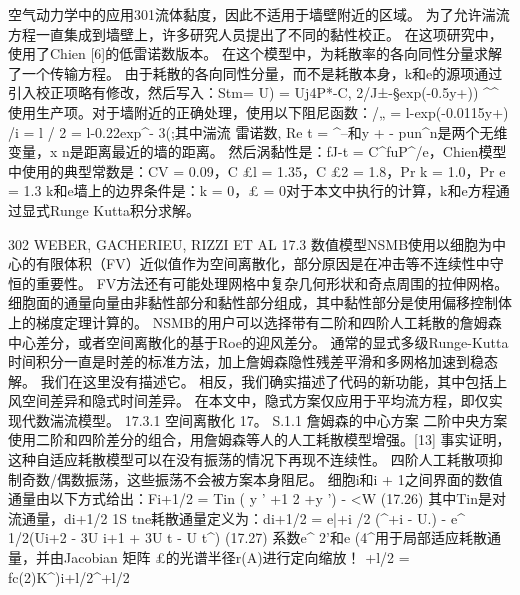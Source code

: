 \documentclass[UTF8,11pt,a4paper,openany,fontset=fandol]{ctexbook}
\begin{document}
空气动力学中的应用301流体黏度，因此不适用于墙壁附近的区域。 为了允许湍流方程一直集成到墙壁上，许多研究人员提出了不同的黏性校正。 在这项研究中，使用了Chien [6]的低雷诺数版本。 在这个模型中，为耗散率的各向同性分量求解了一个传输方程。 由于耗散的各向同性分量，而不是耗散本身，k和e的源项通过引入校正项略有修改，然后写入：Stm= U) = Uj4P*-C, 2/J±-§exp(-0.5y+)) \textasciicircum{}\textasciicircum{}使用生产项。对于墙附近的正确处理，使用以下阻尼函数：/„ = l-exp(-0.0115y+) /i = l / 2 = l-0.22exp\textasciicircum{}- 3(;其中湍流 雷诺数, Re t = \textasciicircum{}--和y + - pun\textasciicircum{}n是两个无维变量，x n是距离最近的墙的距离。 然后涡黏性是：fJ-t = C\textasciicircum{}fuP\textasciicircum{}/e，Chien模型中使用的典型常数是：CV = 0.09，C £l = 1.35，C £2 = 1.8，Pr k = 1.0，Pr e = 1.3 k和e墙上的边界条件是：k = 0，£ = 0对于本文中执行的计算，k和e方程通过显式Runge Kutta积分求解。

302 WEBER, GACHERIEU, RIZZI ET AL 17.3 数值模型NSMB使用以细胞为中心的有限体积（FV）近似值作为空间离散化，部分原因是在冲击等不连续性中守恒的重要性。 FV方法还有可能处理网格中复杂几何形状和奇点周围的拉伸网格。 细胞面的通量向量由非黏性部分和黏性部分组成，其中黏性部分是使用偏移控制体上的梯度定理计算的。 NSMB的用户可以选择带有二阶和四阶人工耗散的詹姆森中心差分，或者空间离散化的基于Roe的迎风差分。 通常的显式多级Runge-Kutta 时间积分一直是时差的标准方法，加上詹姆森隐性残差平滑和多网格加速到稳态解。 我们在这里没有描述它。 相反，我们确实描述了代码的新功能，其中包括上风空间差异和隐式时间差异。 在本文中，隐式方案仅应用于平均流方程，即仅实现代数湍流模型。 17.3.1 空间离散化 17。 S.1.1 詹姆森的中心方案 二阶中央方案使用二阶和四阶差分的组合，用詹姆森等人的人工耗散模型增强。[13] 事实证明，这种自适应耗散模型可以在没有振荡的情况下再现不连续性。 四阶人工耗散项抑制奇数/偶数振荡，这些振荡不会被方案本身阻尼。 细胞i和i + 1之间界面的数值通量由以下方式给出：Fi+1/2 = Tin ( y ' +1 2 +y ') - <W (17.26) 其中Tin是对流通量，di+1/2 1S tne耗散通量定义为：di+1/2 = e|+i /2 (\textasciicircum{}+i - U.) - e\textasciicircum{} 1/2(Ui+2 - 3U i+1 + 3U t - U t\textasciicircum{}) (17.27) 系数e\textasciicircum{} 2'和e (4\textasciicircum{}用于局部适应耗散通量，并由Jacobian 矩阵 £的光谱半径r(A)进行定向缩放！ +l/2 = fc(2)K\textasciicircum{})i+l/2\textasciicircum{}+l/2
\end{document}
